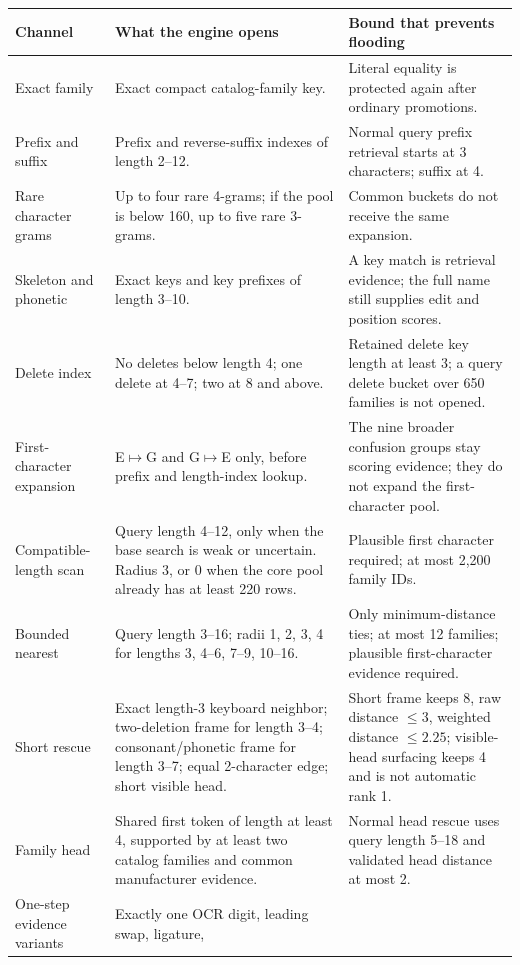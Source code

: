 \documentclass[10pt,a4paper]{article}
\begin{document}
\begin{longtable}{@{}L{34mm}L{68mm}L{64mm}@{}}
\toprule
Channel & What the engine opens & Bound that prevents flooding \\
\midrule
\endhead
Exact family & Exact compact catalog-family key. & Literal equality is
protected again after ordinary promotions. \\
Prefix and suffix & Prefix and reverse-suffix indexes of length 2--12. &
Normal query prefix retrieval starts at 3 characters; suffix at 4. \\
Rare character grams & Up to four rare 4-grams; if the pool is below 160,
up to five rare 3-grams. & Common buckets do not receive the same expansion. \\
Skeleton and phonetic & Exact keys and key prefixes of length 3--10. & A key
match is retrieval evidence; the full name still supplies edit and position scores. \\
Delete index & No deletes below length 4; one delete at 4--7; two at 8 and
above. & Retained delete key length at least 3; a query delete bucket over 650
families is not opened. \\
First-character expansion & E$\mapsto$G and G$\mapsto$E only, before prefix
and length-index lookup. & The nine broader confusion groups stay scoring
evidence; they do not expand the first-character pool. \\
Compatible-length scan & Query length 4--12, only when the base search is weak
or uncertain. Radius 3, or 0 when the core pool already has at least 220 rows. &
Plausible first character required; at most 2,200 family IDs. \\
Bounded nearest & Query length 3--16; radii 1, 2, 3, 4 for lengths 3, 4--6,
7--9, 10--16. & Only minimum-distance ties; at most 12 families; plausible
first-character evidence required. \\
Short rescue & Exact length-3 keyboard neighbor; two-deletion frame for length
3--4; consonant/phonetic frame for length 3--7; equal 2-character edge; short
visible head. & Short frame keeps 8, raw distance $\leq3$, weighted distance
$\leq2.25$; visible-head surfacing keeps 4 and is not automatic rank 1. \\
Family head & Shared first token of length at least 4, supported by at least
two catalog families and common manufacturer evidence. & Normal head rescue
uses query length 5--18 and validated head distance at most 2. \\
One-step evidence variants & Exactly one OCR digit, leading swap, ligature,

\end{longtable}
\end{document}
